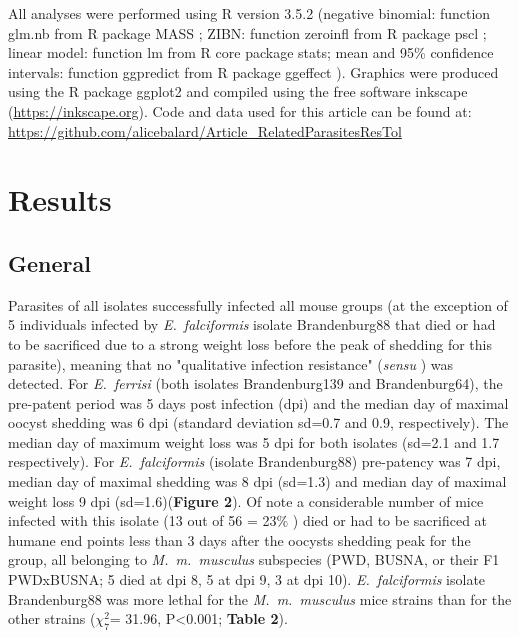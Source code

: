\documentclass[12pt]{article}
\begin{document}
All analyses were performed using R version 3.5.2 \citep{R_2010}(negative binomial: function glm.nb from R package MASS \citep{venables_modern_2002}; ZIBN: function zeroinfl from R package pscl \citep{Jackman2020, Zeileis2008}; linear model: function lm from R core package stats; mean and 95\% confidence intervals: function ggpredict from R package ggeffect \citep{Ldecke2018}). Graphics were prod\textcolor[HTML]{00000A}{uced using the R package ggplot2 \citep{wickham_ggplot2_2016} and compiled using the free software inkscape (\href{https://inkscape.org/}{https://inkscape.org}). Code and data used for this article can be found at: \href{https://github.com/alicebalard/Article_RelatedParasitesResTol}{https://github.com/alicebalard/Article\_RelatedParasitesResTol}}\par

\section*{Results}
\setcounter{subsection}{0}
\renewcommand*{\theHsubsection}{chX.\the\value{subsection}}

\subsection{General}

Parasites of all isolates successfully infected all mouse groups (at the exception of 5 individuals infected by \textit{E.~falciformis} isolate Brandenburg88 that died or had to be sacrificed due to a strong weight loss before the peak of shedding for this parasite), meaning that no "qualitative infection resistance" (\textit{sensu} \cite{Gandon2000}) was detected. For \textit{E.~ferrisi }(both isolates Brandenburg139 and Brandenburg64), the pre-patent period was 5 days post infection (dpi) and the median day of maximal oocyst shedding was 6 dpi (standard deviation sd=0.7 and 0.9, respectively). The median day of maximum weight loss was 5 dpi for both isolates (sd=2.1 and 1.7 respectively). For \textit{E.~falciformis} (isolate Brandenburg88) pre-patency was 7 dpi, median day of maximal shedding was 8 dpi (sd=1.3) and median day of maximal weight loss 9 dpi (sd=1.6)(\textbf{Figure 2}). Of note a considerable number of mice infected with this isolate (13 out of 56 = 23$\%$ ) died or had to be sacrificed at humane end points less than 3 days after the oocysts shedding peak for the group, all belonging to \textit{M.~m.~musculus} subspecies (PWD, BUSNA, or their F1 PWDxBUSNA; 5 died at dpi 8, 5 at dpi 9, 3 at dpi 10). \textit{E.~falciformis }isolate Brandenburg88 was more lethal for the \textit{M.~m.~musculus} mice strains than for the other strains ($\chi_{7}^{2}$= 31.96, P<0.001; \textbf{Table 2}).\par
\end{document}

